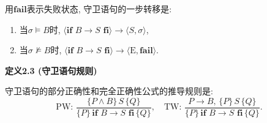\documentclass[UTF8]{ctexart}
\begin{document}
用$\textbf{fail}$表示失败状态, 守卫语句的一步转移是:
\begin{enumerate}
    \item 当$\sigma\models B$时, $\langle\mathbf{if}\,\,B\to S
    \,\,\mathbf{fi}\rangle\to\langle S,\sigma\rangle$,
    \item 当$\sigma\not\models B$时, $\langle\mathbf{if}\,\,B\to S
    \,\,\mathbf{fi}\rangle\to\langle\mathrm{E},\textbf{fail}\rangle$.
\end{enumerate}

\vspace{10pt}

\hypertarget{sec:定义2.3}{}
\noindent\textbf{定义2.3 (守卫语句规则)}

守卫语句的部分正确性和完全正确性公式的推导规则是:
\vspace{5pt}
\[
    \mathrm{PW}:\,\frac{\{P\land B\}\,S\,\{Q\}}
    {\{P\}\,\mathbf{if}\,\,B\to S\,\,\mathbf{fi}\,\{Q\}},\quad
    \mathrm{TW}:\,\frac{P\to B,\,\{P\}\,S\,\{Q\}}
    {\{P\}\,\mathbf{if}\,\,B\to S\,\,\mathbf{fi}\,\{Q\}}.
\]
\end{document}

